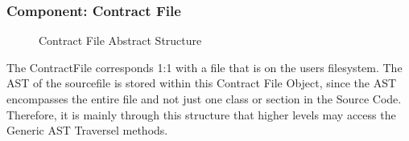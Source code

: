\documentclass{report}
\begin{document}
    \subsubsection{Component: Contract File}
    \begin{figure}
        \caption{Contract File Abstract Structure}
    \end{figure}

	The ContractFile corresponds 1:1 with a file that is on the users filesystem. The AST of the sourcefile is stored within this Contract File Object, since the AST encompasses the entire file and not just one class or section in the Source Code. Therefore, it is mainly through this structure that higher levels may access the Generic AST Traversel methods.

	\newpage
\end{document}
